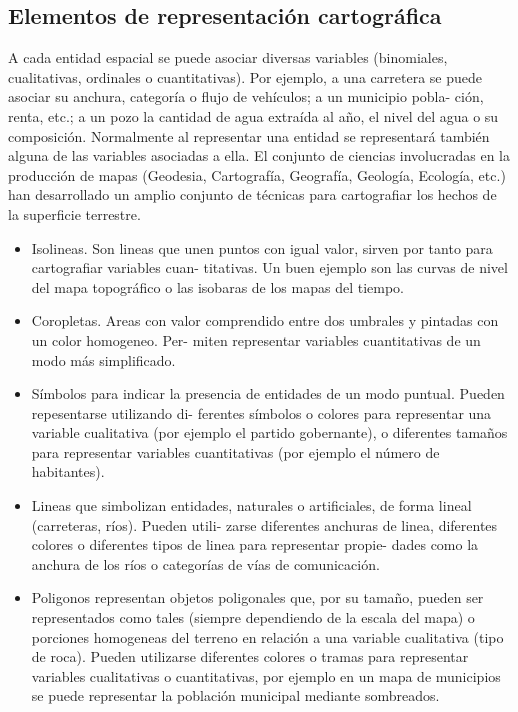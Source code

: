\subsection{Elementos de representación cartográfica}
A cada entidad espacial se puede asociar diversas variables (binomiales, cualitativas, ordinales o cuantitativas).
Por ejemplo, a una carretera se puede asociar su anchura, categoría o flujo de vehículos; a un municipio pobla-
ción, renta, etc.; a un pozo la cantidad de agua extraída al año, el nivel del agua o su composición. Normalmente
al representar una entidad se representará también alguna de las variables asociadas a ella.
El conjunto de ciencias involucradas en la producción de mapas (Geodesia, Cartografía, Geografía, Geología,
Ecología, etc.) han desarrollado un amplio conjunto de técnicas para cartografiar los hechos de la superficie
terrestre.
\begin{itemize}

\item Isolineas. Son lineas que unen puntos con igual valor, sirven por tanto para cartografiar variables cuan-
titativas. Un buen ejemplo son las curvas de nivel del mapa topográfico o las isobaras de los mapas del
tiempo.

\item Coropletas. Areas con valor comprendido entre dos umbrales y pintadas con un color homogeneo. Per-
miten representar variables cuantitativas de un modo más simplificado.

\item Símbolos para indicar la presencia de entidades de un modo puntual. Pueden repesentarse utilizando di-
ferentes símbolos o colores para representar una variable cualitativa (por ejemplo el partido gobernante),
o diferentes tamaños para representar variables cuantitativas (por ejemplo el número de habitantes).

\item Lineas que simbolizan entidades, naturales o artificiales, de forma lineal (carreteras, ríos). Pueden utili-
zarse diferentes anchuras de linea, diferentes colores o diferentes tipos de linea para representar propie-
dades como la anchura de los ríos o categorías de vías de comunicación.

\item Poligonos representan objetos poligonales que, por su tamaño, pueden ser representados como tales
(siempre dependiendo de la escala del mapa) o porciones homogeneas del terreno en relación a una
variable cualitativa (tipo de roca). Pueden utilizarse diferentes colores o tramas para representar variables
cualitativas o cuantitativas, por ejemplo en un mapa de municipios se puede representar la población
municipal mediante sombreados.
\end{itemize}

